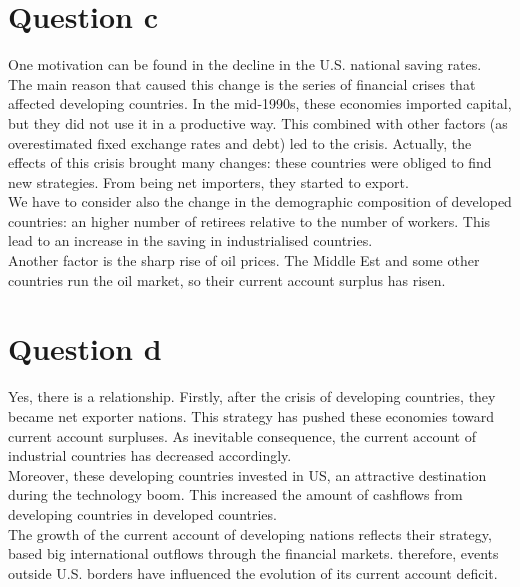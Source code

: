 \documentclass[	11pt, ]{fphw}
\begin{document}
\section*{Question c}
One motivation can be found in the decline in the U.S. national saving rates. \\
The main reason that caused this change is the series of financial crises that affected developing countries. In the mid-1990s, these economies imported capital, but they did not use it in a productive way. This combined with other factors (as overestimated fixed exchange rates and debt) led to the crisis. Actually, the effects of this crisis brought many changes: these countries were obliged to find new strategies. From being net importers, they started to export.\\
We have to consider also the change in the demographic composition of developed countries: an higher number of retirees relative to the number of workers. This lead to an increase in the saving in industrialised countries. \\
Another factor is the sharp rise of oil prices. The Middle Est and some other countries run the oil market, so their current account surplus has risen.


\section*{Question d}
Yes, there is a relationship. Firstly, after the crisis of developing countries, they became net exporter nations. This strategy has pushed these economies toward current account surpluses. As inevitable consequence, the current account of industrial countries has decreased accordingly. \\
Moreover, these developing countries invested in US, an attractive destination during the technology boom.  This increased the amount of cashflows from developing countries in developed countries.\\
The growth of the current account of developing nations reflects their strategy, based big international outflows through the financial markets.
therefore, events outside U.S. borders have influenced the evolution of its current account deficit.
\end{document}
